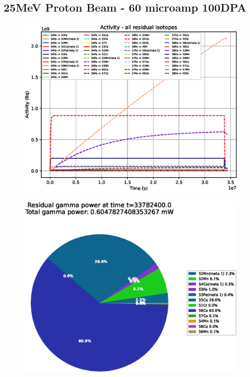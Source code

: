 \clearpage
\FloatBarrier
\subsection{25MeV Proton Beam - 60 microamp 100DPA}

\begin{figure}[!htb]
\centering
\includegraphics[width=0.7\linewidth]{chapters/results_activity_code/fe_100dpa/by_isotope/25MeV_all_radioactive_isotopes.eps}
\caption{}
\label{fig:5mev-proton-100dpa-activity}
\end{figure}

\begin{figure}[!htb]
\centering
\includegraphics[width=0.7\linewidth]{chapters/results_activity_code/fe_100dpa/endofbeam/25MeV_0400_33782400.eps}
\caption{}
\label{fig:5mev-proton-100dpa}
\end{figure}

